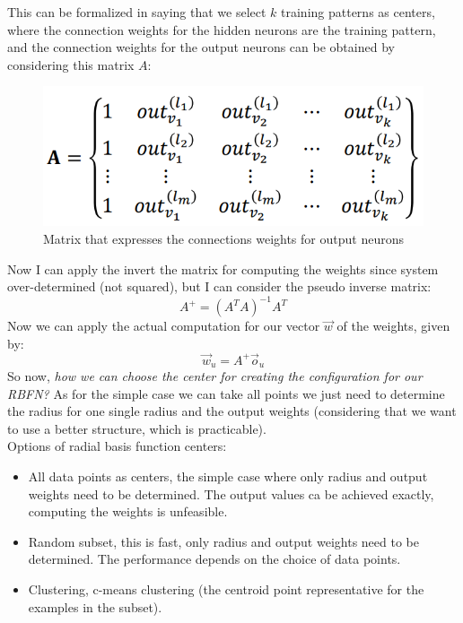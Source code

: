 \documentclass{article}
\begin{document}
This can be formalized in saying that we select $k$ training patterns as centers, where
the connection weights for the hidden neurons are the training pattern, and the connection
weights for the output neurons can be obtained by considering this matrix $A$:
\begin{figure}[H]
    \centering
    \includegraphics[scale=0.4]{images/matrix_conn_weights_rbfn.png}
    \caption{Matrix that expresses the connections weights for output neurons}
\end{figure}
Now I can apply the invert the matrix for computing the weights since system over-determined (not
squared), but I can consider the pseudo inverse matrix:
$$A^+=(A^T A)^{-1} A^T$$
Now we can apply the actual computation for our vector $\vec{w}$ of the weights, given by:
$$\vec{w}_u = A^+\vec{o}_u$$
So now, \textit{how we can choose the center for creating the configuration for our RBFN?} As
for the simple case we can take all points we just need to determine the radius for one single
radius and the output weights (considering that we want to use a better structure, which is
practicable).\\Options of radial basis function centers:
\begin{itemize}
    \item All data points as centers, the simple case where only radius
          and output weights need to be determined. The output values
          ca be achieved exactly, computing the weights is unfeasible.
    \item Random subset, this is fast, only radius and output weights need to be
          determined. The performance depends on the choice of data points.
    \item Clustering, c-means clustering (the centroid point representative for the
          examples in the subset).
\end{itemize}
\end{document}

